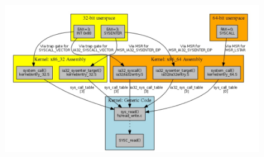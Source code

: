 \documentclass[12pt, oneside]{extbook} %
\begin{document}
\begin{figure}[!h]
	\includegraphics[scale=0.2]{immagini/syscall_paths.png}
\end{figure}
\end{document}
